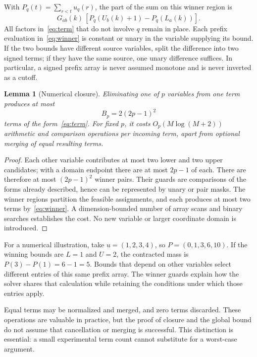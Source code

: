 \documentclass[12pt,a4paper]{article}
\newtheorem{lemma}[theorem]{Lemma}
\theoremstyle{definition}
\begin{document}
With $P_q(t)=\sum_{r<t}u_q(r)$, the part of the sum on this winner region is
\begin{equation}
 G_{ab}(k)\,[P_q(U_b(k)+1)-P_q(L_a(k))].
 \label{eq:winner}
\end{equation}
All factors in~\eqref{eq:term} that do not involve $q$ remain in place.
Each prefix evaluation in~\eqref{eq:winner} is constant or unary in the
variable supplying its bound. If the two bounds have different source
variables, split the difference into two signed terms; if they have the
same source, one unary difference suffices. In particular, a signed prefix
array is never assumed monotone and is never inverted as a cutoff.

\begin{lemma}[Numerical closure]\label{lem:closure}
Eliminating one of $p$ variables from one term produces at most
\[
                         B_p=2(2p-1)^2
\]
terms of the form~\eqref{eq:term}. For fixed $p$, it costs
$O_p(M\log(M+2))$ arithmetic and comparison operations per incoming term,
apart from optional merging of equal resulting terms.
\end{lemma}
\begin{proof}
Each other variable contributes at most two lower and two upper candidates;
with a domain endpoint there are at most $2p-1$ of each. There are therefore
at most $(2p-1)^2$ winner pairs. Their guards are comparisons of the forms
already described, hence can be represented by unary or pair masks.
The winner regions partition the feasible assignments, and each produces
at most two terms by~\eqref{eq:winner}. A dimension-bounded number of
array scans and binary searches establishes the cost. No new variable
or larger coordinate domain is introduced.
\end{proof}

For a numerical illustration, take $u=(1,2,3,4)$, so
$P=(0,1,3,6,10)$. If the winning bounds are $L=1$ and $U=2$,
the contracted mass is $P(3)-P(1)=6-1=5$. Bounds that depend on other
variables select different entries of this same prefix array.
The winner guards explain how the solver shares that calculation while
retaining the conditions under which those entries apply.

Equal terms may be normalized and merged, and zero terms discarded.
These operations are valuable in practice, but the proof of closure and
the global bound do not assume that cancellation or merging is successful.
This distinction is essential: a small experimental term count cannot
substitute for a worst-case argument.
\end{document}
